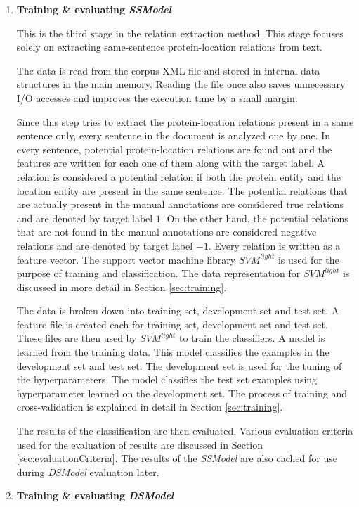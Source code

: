 \begin{enumerate}
\item \textbf{Training \& evaluating \textit{SSModel}}

This is the third stage in the relation extraction method. This stage focuses solely on extracting same-sentence protein-location relations from text.

The data is read from the corpus XML file and stored in internal data structures in the main memory. Reading the file once also saves unnecessary I/O accesses and improves the execution time by a small margin.

Since this step tries to extract the protein-location relations present in a same sentence only, every sentence in the document is analyzed one by one. In every sentence, potential protein-location relations are found out and the features are written for each one of them along with the target label. A relation is considered a potential relation if both the protein entity and the location entity are present in the same sentence. The potential relations that are actually present in the manual annotations are considered true relations and are denoted by target label $1$. On the other hand, the potential relations that are not found in the manual annotations are considered negative relations and are denoted by target label $-1$. Every relation is written as a feature vector. The support vector machine library $SVM^{light}$ \cite{joachims1999making} is used for the purpose of training and classification.  The data representation for $SVM^{light}$ is discussed in more detail in Section \ref{sec:training}.

The data is broken down into training set, development set and test set. A feature file is created each for training set, development set and test set. These files are then used by $SVM^{light}$ to train the classifiers. A model is learned from the training data. This model classifies the examples in the development set and test set. The development set is used for the tuning of the hyperparameters. The model classifies the test set examples using hyperparameter learned on the development set. The process of training and cross-validation is explained in detail in Section \ref{sec:training}.

The results of the classification are then evaluated. Various evaluation criteria used for the evaluation of results are discussed in Section \ref{sec:evaluationCriteria}. The results of the \textit{SSModel} are also cached for use during \textit{DSModel} evaluation later.

\item \textbf{Training \& evaluating \textit{DSModel}}


\end{enumerate}
